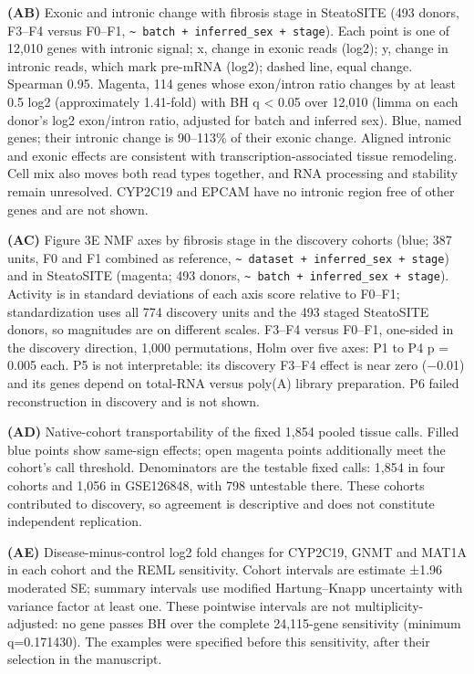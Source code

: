 \textbf{(AB)} Exonic and intronic change with fibrosis stage in SteatoSITE (493 donors, F3--F4 versus F0--F1, \texttt{\textasciitilde{}\ batch\ +\ inferred\_\allowbreak{}sex\ +\ stage}). Each point is one of 12,010 genes with intronic signal; x, change in exonic reads (log2); y, change in intronic reads, which mark pre-mRNA (log2); dashed line, equal change. Spearman 0.95. Magenta, 114 genes whose exon/intron ratio changes by at least 0.5 log2 (approximately 1.41-fold) with BH q \textless{} 0.05 over 12,010 (limma on each donor's log2 exon/intron ratio, adjusted for batch and inferred sex). Blue, named genes; their intronic change is 90--113\% of their exonic change. Aligned intronic and exonic effects are consistent with transcription-associated tissue remodeling. Cell mix also moves both read types together, and RNA processing and stability remain unresolved. CYP2C19 and EPCAM have no intronic region free of other genes and are not shown.

\textbf{(AC)} Figure 3E NMF axes by fibrosis stage in the discovery cohorts (blue; 387 units, F0 and F1 combined as reference, \texttt{\textasciitilde{}\ dataset\ +\ inferred\_\allowbreak{}sex\ +\ stage}) and in SteatoSITE (magenta; 493 donors, \texttt{\textasciitilde{}\ batch\ +\ inferred\_\allowbreak{}sex\ +\ stage}). Activity is in standard deviations of each axis score relative to F0--F1; standardization uses all 774 discovery units and the 493 staged SteatoSITE donors, so magnitudes are on different scales. F3--F4 versus F0--F1, one-sided in the discovery direction, 1,000 permutations, Holm over five axes: P1 to P4 p = 0.005 each. P5 is not interpretable: its discovery F3--F4 effect is near zero (−0.01) and its genes depend on total-RNA versus poly(A) library preparation. P6 failed reconstruction in discovery and is not shown.

\textbf{(AD)} Native-cohort transportability of the fixed
1,854 pooled tissue calls. Filled blue points show same-sign effects; open
magenta points additionally meet the cohort's call threshold. Denominators are
the testable fixed calls: 1,854 in four cohorts and 1,056 in GSE126848, with
798 untestable there. These cohorts contributed to discovery, so agreement is
descriptive and does not constitute independent replication.

\textbf{(AE)} Disease-minus-control log2 fold changes
for CYP2C19, GNMT and MAT1A in each cohort and the REML sensitivity. Cohort
intervals are estimate ±1.96 moderated SE; summary intervals use modified
Hartung--Knapp uncertainty with variance factor at least one. These pointwise
intervals are not multiplicity-adjusted: no gene passes BH over the complete
24,115-gene sensitivity (minimum q=0.171430). The examples were specified before
this sensitivity, after their selection in the manuscript.

